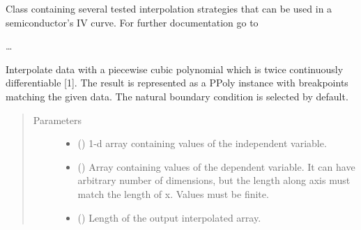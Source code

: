 \documentclass[letterpaper,10pt,english,openany, oneside]{sphinxmanual}
\begin{document}
\begin{fulllineitems}
\label{\detokenize{index:fompy.conditioning.interpolator}}
Class containing several tested interpolation strategies that can be used in a semiconductor’s IV curve.
For further documentation go to  

…

\begin{fulllineitems}
\label{\detokenize{index:fompy.conditioning.interpolator.spline_interpol}}
Interpolate data with a piecewise cubic polynomial which is twice
continuously differentiable {[}1{]}. The result is represented as a PPoly
instance with breakpoints matching the given data. The natural boundary
condition is selected by default.

\end{fulllineitems}

\begin{quote}\begin{description}
\item[{Parameters}] \leavevmode\begin{itemize}
\item {} 
 (\sphinxstyleliteralemphasis{\sphinxupquote{, }}\sphinxstyleliteralemphasis{\sphinxupquote{ (}}\sphinxstyleliteralemphasis{\sphinxupquote{,}}\sphinxstyleliteralemphasis{\sphinxupquote{)}}) \textendash{} 1-d array containing values of the independent variable.

\item {} 
 () \textendash{} Array containing values of the dependent variable.
It can have arbitrary number of dimensions, but the length along axis
must match the length of x. Values must be finite.

\item {} 
 () \textendash{} Length of the output interpolated array.


\end{itemize}
\end{description}
\end{quote}
\end{fulllineitems}
\end{document}
